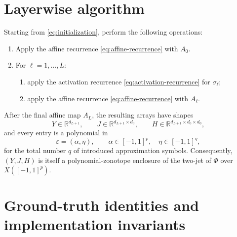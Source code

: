 \documentclass[11pt]{article}
\newcommand{\R}{\mathbb{R}}
\newcommand{\eps}{\varepsilon}
\begin{document}
\section{Layerwise algorithm}

Starting from \eqref{eq:initialization}, perform the following operations:
\begin{enumerate}
    \item Apply the affine recurrence \eqref{eq:affine-recurrence} with
          \(A_0\).
    \item For \(\ell=1,\ldots,L\):
          \begin{enumerate}
              \item apply the activation recurrence
                    \eqref{eq:activation-recurrence} for \(\sigma_\ell\);
              \item apply the affine recurrence
                    \eqref{eq:affine-recurrence} with \(A_\ell\).
          \end{enumerate}
\end{enumerate}
After the final affine map \(A_L\), the resulting arrays have shapes
\begin{equation}
    Y\in\R^{d_{L+1}},
    \qquad
    J\in\R^{d_{L+1}\times d_0},
    \qquad
    H\in\R^{d_{L+1}\times d_0\times d_0},
    \label{eq:output-shapes}
\end{equation}
and every entry is a polynomial in
\begin{equation}
    \eps=(\alpha,\eta),
    \qquad
    \alpha\in[-1,1]^p,
    \quad
    \eta\in[-1,1]^q,
    \label{eq:all-noises}
\end{equation}
for the total number \(q\) of introduced approximation symbols.  Consequently,
\((Y,J,H)\) is itself a polynomial-zonotope enclosure of the two-jet of
\(\Phi\) over \(X([-1,1]^p)\).

\section{Ground-truth identities and implementation invariants}
\end{document}

